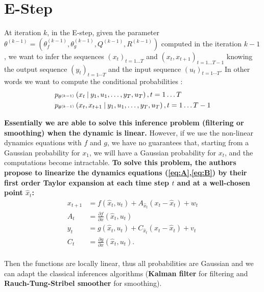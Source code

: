 \section{E-Step}

At iteration $k$, in the E-step, given the parameter $\theta^{(k-1)} = \left( \theta_f^{(k-1)}, \theta_g^{(k-1)}, Q^{(k-1)}, R^{(k-1)} \right)$ computed in the iteration $k-1$, we want to infer the sequences $(x_t)_{t=1 \ldots T}$ and $(x_t, x_{t+1})_{t=1 \ldots T-1}$ knowing the output sequence $(y_t)_{t=1 \cdots T}$ and the input sequence $(u_t)_{t=1 \cdots T}$.
In other words we want to compute the conditional probabilities :
\begin{align*}
  &p_{\theta^{(k-1)}}\left(x_t \mathbin{\vert} y_1, u_1, \ldots, y_T, u_T \right), t=1 \ldots T\\
  &p_{\theta^{(k-1)}}\left(x_t, x_{t+1} \mathbin{\vert} y_1, u_1, \ldots, y_T, u_T \right), t=1 \ldots T-1\\
\end{align*}


\textbf{Essentially we are able to solve this inference problem (filtering or smoothing) when the dynamic is linear.} However,  if we use the non-linear dynamics equations with $f$ and $g$, we have no guarantees that, starting from a Gaussian probability for $x_1$, we will have a Gaussian probability for $x_{t}$, and the computations become intractable.
\textbf{To solve this problem, the authors propose to linearize the dynamics equations (\ref{eq:A},\ref{eq:B}) by their first order Taylor expansion at each time step $t$ and at a well-chosen point $\hat{x}_t$:}
\begin{align*}
  x_{t+1} &= f(\hat{x}_t, u_t) + A_{\hat{x}_t} (x_t - \hat{x}_t) + w_t\\
  A_t &= \frac{\partial f}{\partial x}(\hat{x}_t, u_t)\\
  y_t &= g(\hat{x}_t, u_t) + C_{\hat{x}_t} (x_t - \hat{x}_t) + v_t\\
  C_t &= \frac{\partial g}{\partial x}(\hat{x}_t, u_t).\\
\end{align*}

Then the functions are locally linear, thus all probabilities are Gaussian and we can adapt the classical inferences algorithms (\textbf{Kalman filter} for filtering and \textbf{Rauch-Tung-Stribel smoother} for smoothing).\\


